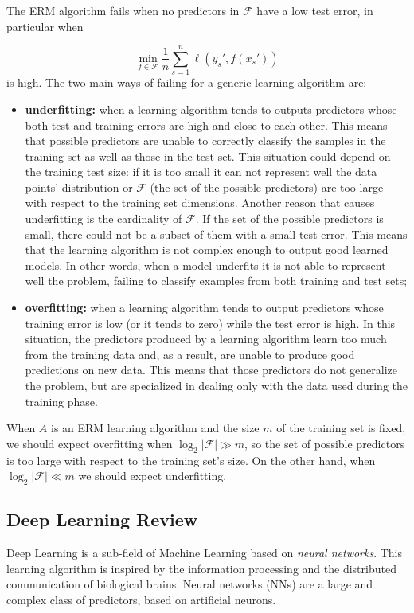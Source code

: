 The ERM algorithm fails when no predictors in $\mathcal{F}$ have a low test error, in particular when 

\begin{equation}
	\min_{f \in \mathcal{F}} \frac{1}{n} \sum_{s = 1}^{n} \ell(y_s', f(x_s'))
\end{equation} 
is high. The two main ways of failing for a generic learning algorithm are:
\begin{itemize}
	\item \textbf{underfitting:} when a learning algorithm tends to outputs predictors whose both test and training errors are high and close to each other. This means that possible predictors are unable to correctly classify the samples in the training set as well as those in the test set. This situation could depend on the training test size: if it is too small it can not represent well the data points' distribution or $\mathcal{F}$ (the set of the possible predictors) are too large with respect to the training set dimensions. Another reason that causes underfitting is the cardinality of $\mathcal{F}$. If the set of the possible predictors is small, there could not be a subset of them with a small test error. This means that the learning algorithm is not complex enough to output good learned models. In other words, when a model underfits it is not able to represent well the problem, failing to classify examples from both training and test sets;
	\item \textbf{overfitting:} when a learning algorithm tends to output predictors whose training error is low (or it tends to zero) while the test error is high. In this situation, the predictors produced by a learning algorithm learn too much from the training data and, as a result, are unable to produce good predictions on new data. This means that those predictors do not generalize the problem, but are specialized in dealing only with the data used during the training phase.
\end{itemize}

When $A$ is an ERM learning algorithm and the size $m$ of the training set is fixed, we should expect overfitting when $\log_2|\mathcal{F}| \gg m$, so the set of possible predictors is too large with respect to the training set's size. On the other hand, when $\log_2|\mathcal{F}| \ll m$ we should expect underfitting.

\subsection{Deep Learning Review}
Deep Learning is a sub-field of Machine Learning based on \textit{neural networks}. This learning algorithm is inspired by the information processing and the distributed communication of biological brains. Neural networks (NNs) are a large and complex class of predictors, based on artificial neurons.

